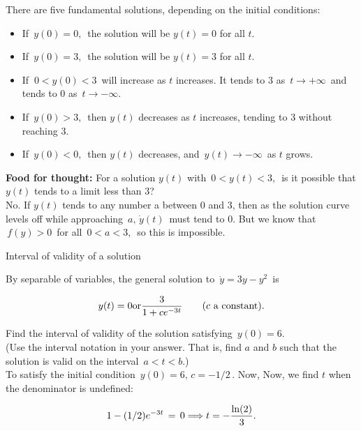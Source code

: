 There are five fundamental solutions, depending on the initial conditions:

\begin{itemize}
\item If $\,y(0)=0,\,$ the solution will be $y(t)=0$ for all $t$.
\item If $\,y(0)=3,\,$ the solution will be $y(t)=3$ for all $t$.
\item If $\ 0< y(0) <3 \,$ will increase as $t$ increases.
  It tends to $3$ as $\, t \to + \infty \, $ and tends to $0$ as $\, t \to −\infty$.
\item If $\, y(0)>3,\,$ then $y(t)$ decreases as $t$ increases, tending to $3$ without reaching $3$.
\item If $\, y(0)<0,\,$ then $y(t)$ decreases, and $\, y(t) \to −\infty\,$ as $t$ grows.
\end{itemize}

\textbf{\color{orange} Food for thought: }
For a solution $y(t)$ with $\, 0<y(t)<3,\,$
is it possible that $y(t)$ tends to a limit less than $3$? \\

No. If $y(t)$ tends to any number a between $0$ and $3$,
then as the solution curve levels off while approaching $\,a, \, \dot y (t)\,$ must tend to $0$.
But we know that $\, f(y)>0 \,$ for all $\, 0<a<3,\,$ so this is impossible.

\begin{exercise}
  Interval of validity of a solution
\end{exercise}

By separable of variables, the general solution to $\, \dot y = 3y -y^2\,$ is

\begin{equation*}
  \displaystyle \displaystyle y(t) = 0 \displaystyle \text {or}
  \displaystyle \frac{3}{1+c e^{-3t}}\qquad (c \, \, \text {a constant}).
\end{equation*}

Find the interval of validity of the solution satisfying $\, y(0)=6$.\\
(Use the interval notation in your answer.
That is, find $a$ and $b$ such that the solution is valid on the interval
$\, a<t<b$.) \\

To satisfy the initial condition $\,y(0) = 6,\, c = -1/2\,.$
Now, Now, we find $t$ when the denominator is undefined:

\begin{equation*}
  \displaystyle  \displaystyle 1- (1/2) e^{-3t}\, =\,  0
  \displaystyle \Longrightarrow
  \displaystyle  t=-\frac{\ln (2)}{3}.
\end{equation*}

